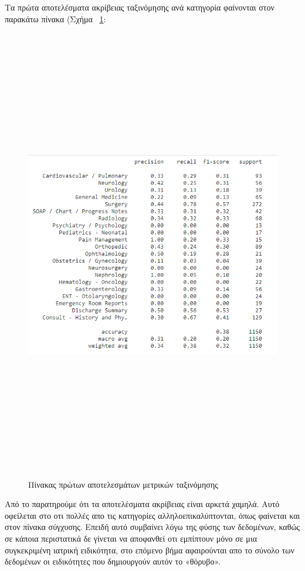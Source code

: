 Τα πρώτα αποτελέσματα ακρίβειας ταξινόμησης ανά κατηγορία φαίνονται στον παρακάτω πίνακα (Σχήμα ~\ref{figure5.4}:
 
\begin{figure} [ht!]
\centering
\includegraphics[width=\textwidth,height=20cm,keepaspectratio]{pictures/5.4results.png} 
\caption{Πίνακας πρώτων αποτελεσμάτων μετρικών ταξινόμησης}\label{figure5.4}
\end{figure}
\clearpage

Από το  παρατηρούμε ότι τα αποτελέσματα ακρίβειας είναι αρκετά χαμηλά. Αυτό οφείλεται στο οτι πολλές απο τις κατηγορίες αλληλοεπικαλύπτονται, όπως φαίνεται και στον πίνακα σύγχυσης. Επειδή αυτό συμβαίνει λόγω της φύσης των δεδομένων, καθώς σε κάποια περιστατικά δε γίνεται να αποφανθεί οτι εμπίπτουν μόνο σε μια συγκεκριμένη ιατρική ειδικότητα, στο επόμενο βήμα αφαιρούνται απο το σύνολο των δεδομένων οι ειδικότητες που δημιουργούν αυτόν το «θόρυβο».

